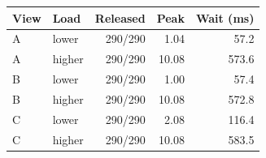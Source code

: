 \begin{tabular}{llrrr}\toprule
View & Load & Released & Peak & Wait (ms) \\ \midrule
A & lower & 290/290 & 1.04 & 57.2 \\
A & higher & 290/290 & 10.08 & 573.6 \\
B & lower & 290/290 & 1.00 & 57.4 \\
B & higher & 290/290 & 10.08 & 572.8 \\
C & lower & 290/290 & 2.08 & 116.4 \\
C & higher & 290/290 & 10.08 & 583.5 \\
\bottomrule
\end{tabular}
